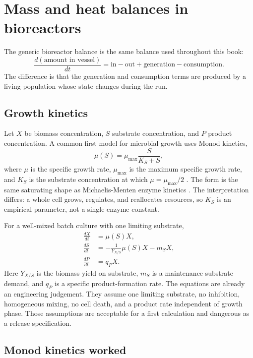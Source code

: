 \section{Mass and heat balances in bioreactors}

The generic bioreactor balance is the same balance used throughout this
book:
\[
\frac{d(\text{amount in vessel})}{dt}
= \text{in} - \text{out} + \text{generation} - \text{consumption}.
\]
The difference is that the generation and consumption terms are produced
by a living population whose state changes during the run.

\subsection{Growth kinetics}

Let $X$ be biomass concentration, $S$ substrate concentration, and $P$
product concentration. A common first model for microbial growth uses
Monod kinetics,
\[
\mu(S) = \mu_{\max}\frac{S}{K_S + S},
\]
where $\mu$ is the specific growth rate, $\mu_{\max}$ is the maximum
specific growth rate, and $K_S$ is the substrate concentration at which
$\mu = \mu_{\max}/2$ \cite{paper:v6c10-monod-1949}. The form is the
same saturating shape as Michaelis-Menten enzyme kinetics
\cite{paper:v6c10-michaelis-menten-1913}. The interpretation differs: a
whole cell grows, regulates, and reallocates resources, so $K_S$ is an
empirical parameter, not a single enzyme constant.



For a well-mixed batch culture with one limiting substrate,
\begin{align*}
\frac{dX}{dt} &= \mu(S)X, \\
\frac{dS}{dt} &= -\frac{1}{Y_{X/S}}\mu(S)X - m_S X, \\
\frac{dP}{dt} &= q_P X.
\end{align*}
Here $Y_{X/S}$ is the biomass yield on substrate, $m_S$ is a
maintenance substrate demand, and $q_P$ is a specific product-formation
rate. The equations are already an engineering judgement. They assume
one limiting substrate, no inhibition, homogeneous mixing, no cell
death, and a product rate independent of growth phase. Those assumptions
are acceptable for a first calculation and dangerous as a release
specification.

\subsection{Monod kinetics worked}

